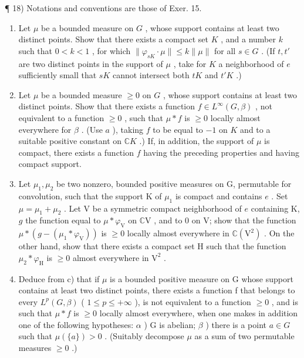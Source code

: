 ¶ 18) Notations and conventions are those of Exer. 15.

\begin{enumerate}
\def\labelenumi{\alph{enumi})}
\item
  Let \(\mu\) be a bounded measure on \(G\) , whose support contains at least two distinct points. Show that there exists a compact set \(K\) , and a number \(k\) such that \(0 < k < 1\) , for which \(\| \varphi_{sK} \cdot \mu \| \leqslant k \| \mu \|\) for all \(s \in G\) . (If \(t, t'\) are two distinct points in the support of \(\mu\) , take for \(K\) a neighborhood of \(e\) sufficiently small that \(sK\) cannot intersect both \(tK\) and \(t'K\) .)
\item
  Let \(\mu\) be a bounded measure \(\geqslant 0\) on \(G\) , whose support contains at least two distinct points. Show that there exists a function \(f \in L^{\infty}(G, \beta)\) , not equivalent to a function \(\geqslant 0\) , such that \(\mu * f\) is \(\geqslant 0\) locally almost everywhere for \(\beta\) . (Use \(a\) ), taking \(f\) to be equal to \(-1\) on \(K\) and to a suitable positive constant on \(\mathbb{C}K\) .) If, in addition, the support of \(\mu\) is compact, there exists a function \(f\) having the preceding properties and having compact support.
\item
  Let \(\mu_{1},\mu_{2}\) be two nonzero, bounded positive measures on G, permutable for convolution, such that the support K of \(\mu_{1}\) is compact and contains \(e\) . Set \(\mu = \mu_{1} + \mu_{2}\) . Let V be a symmetric compact neighborhood of \(e\) containing K, \(g\) the function equal to \(\mu * \varphi_{\mathrm{V}}\) on \(\mathbb{C}\mathrm{V}\) , and to 0 on V; show that the function \(\mu * (g - (\mu_1 * \varphi_{\mathrm{V}}))\) is \(\geqslant 0\) locally almost everywhere in \(\mathbb{C}(\mathrm{V}^2)\) . On the other hand, show that there exists a compact set H such that the function \(\mu_{2} * \varphi_{\mathrm{H}}\) is \(\geqslant 0\) almost everywhere in \(\mathrm{V}^2\) .
\item
  Deduce from c) that if \(\mu\) is a bounded positive measure on G whose support contains at least two distinct points, there exists a function f that belongs to every \(L^{p}(G,\beta)\) ( \(1 \leqslant p \leqslant +\infty\) ), is not equivalent to a function \(\geqslant 0\) , and is such that \(\mu * f\) is \(\geqslant 0\) locally almost everywhere, when one makes in addition one of the following hypotheses: \(\alpha\) ) G is abelian; \(\beta\) ) there is a point \(a \in G\) such that \(\mu(\{a\}) > 0\) . (Suitably decompose \(\mu\) as a sum of two permutable measures \(\geqslant 0\) .)
\end{enumerate}

